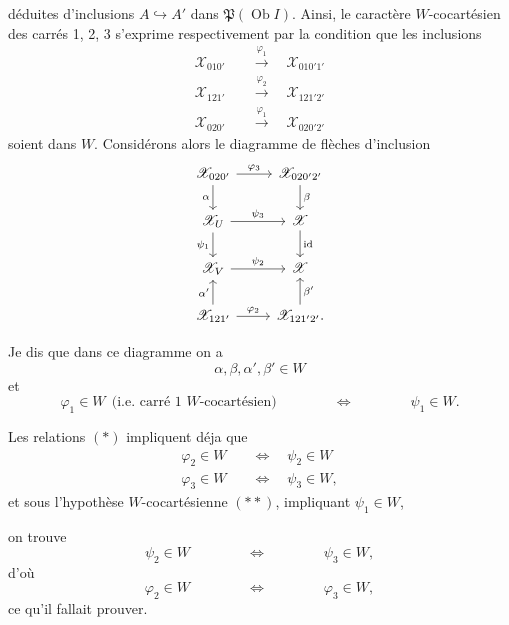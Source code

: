 \documentclass[11pt]{article}
\newcommand{\printedpage}[1]{\marginpar{\footnotesize p.~#1}}
\newcommand{\msp}[1]{\marginpar{\footnotesize [#1]}}
\newcommand{\cX}{\mathscr{X}}
\newcommand{\Ob}{\operatorname{Ob}}
\begin{document}
\msp{page 237}

déduites d'inclusions $A \hookrightarrow A'$ dans $\mathfrak{P}(\Ob I)$. Ainsi, le caractère $W$-cocartésien des carrés 1, 2, 3 s'exprime respectivement par la condition que les inclusions
\[
\begin{aligned}
\cX_{010'} \quad &\xrightarrow{\varphi_1} \quad \cX_{010'1'} \\
\cX_{121'} \quad &\xrightarrow{\varphi_2} \quad \cX_{121'2'} \\
\cX_{020'} \quad &\xrightarrow{\varphi_1} \quad \cX_{020'2'} %
\end{aligned}
\]
soient dans $W$. Considérons alors le diagramme de flèches d'inclusion
\printedpage{153}
\[
\begin{tikzcd}
\cX_{020'} \arrow[r, "\varphi_3"] \arrow[d, "\alpha"'] & \cX_{020'2'} \arrow[d, "\beta"] \\
\cX_U \arrow[r, "\psi_3"] \arrow[d, "\psi_1"'] & \cX \arrow[d, "\mathrm{id}"] \\
\cX_V \arrow[r, "\psi_2"] & \cX \\
\cX_{121'} \arrow[r, "\varphi_2"] \arrow[u, "\alpha'"] & \cX_{121'2'}. \arrow[u, "\beta'"']
\end{tikzcd}
\]

Je dis que dans ce diagramme on a
\[
\alpha, \beta, \alpha', \beta' \in W
\tag*{$(\ast)$}
\]
et
\[
\varphi_1 \in W \ \ \text{(i.e. carré 1 $W$-cocartésien)} \qquad\qquad \Longleftrightarrow \qquad\qquad \psi_1 \in W.
\tag*{$(\ast\ast)$}
\]

Les relations $(\ast)$ impliquent déja que %
\[
\begin{aligned}
\varphi_2 \in W \quad &\Longleftrightarrow \quad \psi_2 \in W \\
\varphi_3 \in W \quad &\Longleftrightarrow \quad \psi_3 \in W,
\end{aligned}
\]
et sous l'hypothèse $W$-cocartésienne $(\ast\ast)$, impliquant $\psi_1 \in W$,

\msp{page 238}

on trouve
\[
\psi_2 \in W \qquad\qquad \Longleftrightarrow \qquad\qquad \psi_3 \in W,
\]
d'où
\[
\varphi_2 \in W \qquad\qquad \Longleftrightarrow \qquad\qquad \varphi_3 \in W,
\]
ce qu'il fallait prouver.
\end{document}
